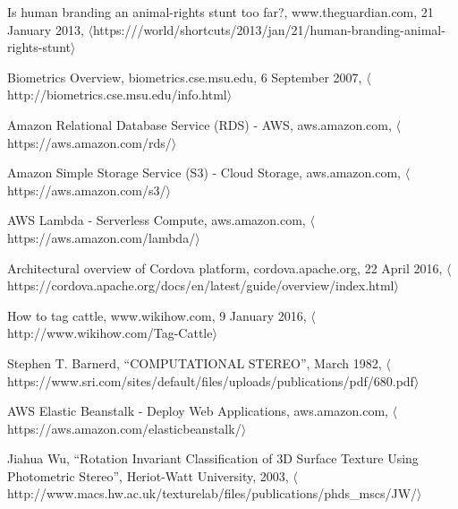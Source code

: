 \begin{thebibliography}{1}

  Is human branding an animal-rights stunt too far?,
  www.theguardian.com,
  21 January 2013,
  $\langle$https:///world/shortcuts/2013/jan/21/human-branding-animal-rights-stunt$\rangle$

  Biometrics Overview,
  biometrics.cse.msu.edu,
  6 September 2007,
  $\langle$http://biometrics.cse.msu.edu/info.html$\rangle$

  Amazon Relational Database Service (RDS) - AWS,
  aws.amazon.com,
  $\langle$https://aws.amazon.com/rds/$\rangle$

  Amazon Simple Storage Service (S3) - Cloud Storage,
  aws.amazon.com,
  $\langle$https://aws.amazon.com/s3/$\rangle$

  AWS Lambda - Serverless Compute,
  aws.amazon.com,
  $\langle$https://aws.amazon.com/lambda/$\rangle$
  
  Architectural overview of Cordova platform,
  cordova.apache.org,
  22 April 2016,
  $\langle$https://cordova.apache.org/docs/en/latest/guide/overview/index.html$\rangle$
  
  How to tag cattle,
  www.wikihow.com,
  9 January 2016,
  $\langle$http://www.wikihow.com/Tag-Cattle$\rangle$

  Stephen T. Barnerd,
  ``COMPUTATIONAL STEREO'',
  March 1982,
  $\langle$https://www.sri.com/sites/default/files/uploads/publications/pdf/680.pdf$\rangle$

  AWS Elastic Beanstalk - Deploy Web Applications,
  aws.amazon.com,
  $\langle$https://aws.amazon.com/elasticbeanstalk/$\rangle$

  Jiahua Wu,
  ``Rotation Invariant Classification of 3D Surface Texture Using Photometric Stereo'',
  Heriot-Watt University,
  2003,
  $\langle$http://www.macs.hw.ac.uk/texturelab/files/publications/phds\_mscs/JW/$\rangle$

\end{thebibliography}

